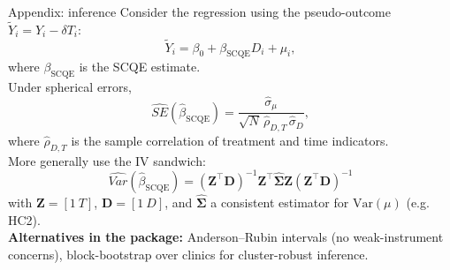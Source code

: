 \documentclass[xcolor=dvipsnames]{beamer}
\newcommand{\Var}{\mathrm{Var}}
\DeclareMathOperator{\SCQE}{SCQE}
\begin{document}
\begin{frame}{Appendix: inference}
\small
Consider the regression using the pseudo-outcome $\tilde Y_i = Y_i - \delta T_i$:
\[
    \tilde{Y}_i = \beta_0 + \beta_{\SCQE} D_i + \mu_i,
\]
where $\beta_{\SCQE}$ is the SCQE estimate.\\
\medskip
{} Under spherical errors,
\footnotesize
\[
\widehat{SE}(\hat\beta_{\SCQE}) = \frac{\hat\sigma_\mu}{\sqrt{N}\,\hat\rho_{D,T}\,\hat\sigma_D},
\]
\normalsize\small
where $\hat\rho_{D,T}$ is the sample correlation of treatment and time indicators.\\
\medskip
{} More generally use the IV sandwich:
\footnotesize
\[
  \widehat{Var}(\hat\beta_{\SCQE}) = (\mathbf{Z}^\top \mathbf{D})^{-1}\mathbf{Z}^\top \hat{\mathbf{\Sigma}} \mathbf{Z}(\mathbf{Z}^\top \mathbf{D})^{-1}
\]
\normalsize\small
with $\mathbf{Z} = [1\ T]$, $\mathbf{D} = [1\ D]$, and $\hat{\mathbf{\Sigma}}$ a consistent estimator for $\Var(\mu)$ (e.g. HC2).\\
\medskip
{} \textbf{Alternatives in the package:} Anderson--Rubin intervals (no weak-instrument concerns), block-bootstrap over clinics for cluster-robust inference.
\end{frame}
\end{document}

